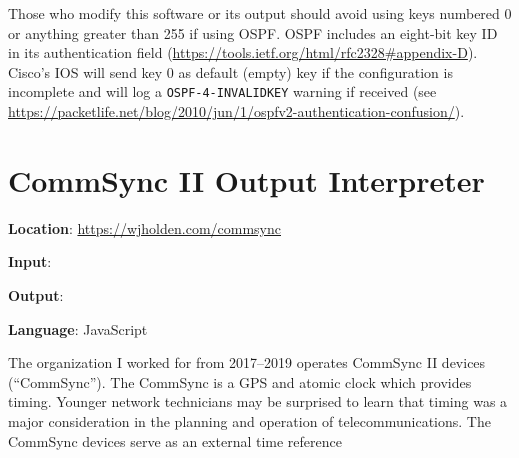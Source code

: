 \documentclass[12pt]{article}
\begin{document}
Those who modify this software or its output should avoid using keys numbered 0 or anything greater than 255 if using OSPF. OSPF includes an eight-bit key ID in its authentication field (\url{https://tools.ietf.org/html/rfc2328#appendix-D}). Cisco's IOS will send key 0 as default (empty) key if the configuration is incomplete and will log a \texttt{OSPF-4-INVALIDKEY} warning if received (see \url{https://packetlife.net/blog/2010/jun/1/ospfv2-authentication-confusion/}).

\section{CommSync II Output Interpreter}

\textbf{Location}: \url{https://wjholden.com/commsync}

\textbf{Input}: 

\textbf{Output}: 

\textbf{Language}: JavaScript

The organization I worked for from 2017--2019 operates CommSync II devices (``CommSync'').
The CommSync is a GPS and atomic clock which provides timing.
Younger network technicians may be surprised to learn that timing was a major consideration in the planning and operation of telecommunications.
The CommSync devices serve as an external time reference 
\end{document}

